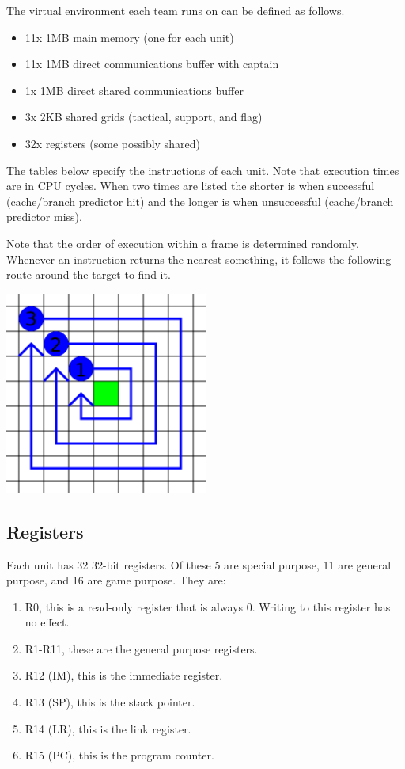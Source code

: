 \documentclass{article}
\begin{document}
The virtual environment each team runs on can be defined as follows.

\begin{itemize}[noitemsep]
    \item 11x 1MB main memory (one for each unit)
    \item 11x 1MB direct communications buffer with captain
    \item 1x 1MB direct shared communications buffer
    \item 3x 2KB shared grids (tactical, support, and flag)
    \item 32x registers (some possibly shared)
\end{itemize}

The tables below specify the instructions of each unit. Note that execution
times are in CPU cycles. When two times are listed the shorter is when
successful (cache/branch predictor hit) and the longer is when unsuccessful
(cache/branch predictor miss).

Note that the order of execution within a frame is determined randomly. Whenever
an instruction returns the nearest something, it follows the following route
around the target to find it.

{\centering\includegraphics[width=0.5\textwidth]{res/nearest.png}\par}

\subsection*{Registers}

Each unit has 32 32-bit registers. Of these 5 are special purpose, 11 are
general purpose, and 16 are game purpose. They are:

\begin{enumerate}[noitemsep]
    \item R0, this is a read-only register that is always 0. Writing to this
        register has no effect.
    \item R1-R11, these are the general purpose registers.
    \item R12 (IM), this is the immediate register.
    \item R13 (SP), this is the stack pointer.
    \item R14 (LR), this is the link register.
    \item R15 (PC), this is the program counter.
\end{enumerate}
\end{document}
